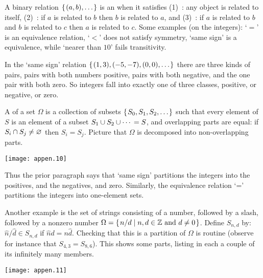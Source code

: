 A binary relation \( \mbox{$\{\hspace{0.1em}(a,b),\ldots \hspace{0.1em}\}$} \)
is an 
when it satisfies
(1)~: 
     any object is related to itself,
(2)~: 
     if \( a \) is related to \( b \) then
     \( b \) is related to \( a \), and
(3)~:
     if \( a \) is related to \( b \) and \( b \) is
     related to \( c \) then \( a \) is related to \( c \).
Some examples (on the integers): `\( = \)' is an equivalence relation,
`\( < \)' does not satisfy symmetry,
`same sign' is a equivalence, while `nearer than \( 10 \)' fails transitivity.






In the `same sign' relation \( \mbox{$\{\hspace{0.1em} (1,3),(-5,-7),(0,0),\ldots\hspace{0.1em}\}$} \)
there are three kinds of pairs, pairs with both numbers positive,
pairs with both negative, and the one pair with both zero.
So integers fall into exactly one of three classes, positive, or negative,
or zero.

A  
of a set \( \Omega \) is a collection of subsets
\( \mbox{$\{\hspace{0.1em}S_0,S_1,S_2,\ldots\hspace{0.1em}\}$} \) such that
every element of \( S \) is an element of a subset
\( S_1\cup S_2\cup \cdots{} = S \), and overlapping parts are equal:
if \( S_i\cap S_j\neq\varnothing \) then $S_i=S_j$.
Picture that \( \Omega \) is decomposed into non-overlapping parts.
\begin{center}
  \texttt{[image: appen.10]}
\end{center}
Thus the prior paragraph says that `same sign' partitions
the integers into the positives, and the negatives, and zero.
Similarly, the equivalence relation `=' partitions the integers into
one-element sets.

Another example is the set of strings consisting of a number, followed
by a slash,
followed by a nonzero number
$\Omega=\mbox{$\{\hspace{0.1em}n/d\mid \text{$n,d\in\mathbb{Z}$ and $d\neq 0$}\hspace{0.1em}\}$}$.
Define $S_{n,d}$ by: $\hat{n}/\hat{d}\in S_{n,d}$ if 
$\hat{n}d=n\hat{d}$.
Checking that this is a partition of $\Omega$ is routine
(observe for instance that $S_{4,3}=S_{8,6}$).
This shows some parts, listing in each a couple of its infinitely many members. 
\begin{center}
  \texttt{[image: appen.11]}
\end{center}


